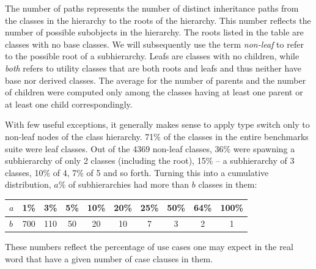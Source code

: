 The number of paths represents the number of distinct inheritance paths from the 
classes in the hierarchy to the roots of the hierarchy. This number reflects the number of possible subobjects in the 
hierarchy. The roots listed in the table are classes with no base classes. We 
will subsequently use the term \emph{non-leaf} to refer to the possible root of 
a subhierarchy. Leafs are classes with no children, while \emph{both} refers to 
utility classes that are both roots and leafs and thus neither have base nor 
derived classes. The average for the number of parents and the number of 
children were computed only among the classes having at least one parent or at 
least one child correspondingly.

With few useful exceptions, it generally makes sense to apply type switch only 
to non-leaf nodes of the class hierarchy. 71\% of the classes in the entire 
benchmarks suite were leaf classes. Out of the 4369 non-leaf classes, 36\% were 
spawning a subhierarchy of only 2 classes (including the root), 15\% -- a 
subhierarchy of 3 classes, 10\% of 4, 7\% of 5 and so forth. 
Turning this into a cumulative distribution, $a\%$ of subhierarchies had more 
than $b$ classes in them:

\begin{tabular}
{l||@{ }c@{ }|@{ }c@{ }|@{ }c@{ }|@{ }c@{ }|@{ }c@{ }|@{ }c@{ }|@{ }c@{ }|@{ }c@{ }|@{ }c@{ }}
$a$ & 1\% & 3\% & 5\% & 10\% & 20\% & 25\% & 50\% & 64\% & 100\% \\
\hline %
$b$ & 700 & 110 & 50  & 20   & 10   & 7    & 3    & 2    & 1
\end{tabular}


\noindent
These numbers reflect the percentage of use cases one may expect in the real 
word that have a given number of case clauses in them.

